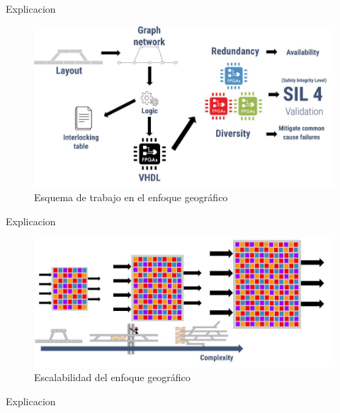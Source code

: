 	Explicacion
		
		\begin{figure}[h]
		\centering
			\includegraphics[scale=.4]{./Figures/Geografico_workflow}
			\caption{Esquema de trabajo en el enfoque geográfico}
			\label{fig:Funcional}
		\end{figure}
	
	Explicacion
			
		\begin{figure}[h]
		\centering
			\includegraphics[scale=.4]{./Figures/Geografico_complejidad}
			\caption{Escalabilidad del enfoque geográfico}
			\label{fig:Funcional}
		\end{figure}
		
	Explicacion